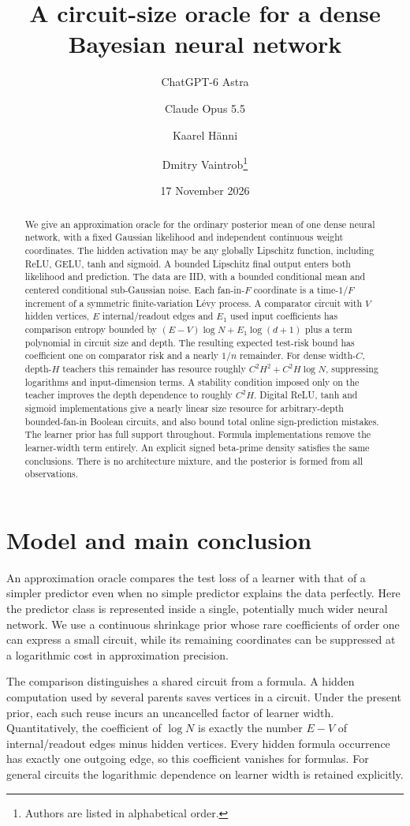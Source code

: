 \documentclass[11pt]{article}
\title{A circuit-size oracle for a dense\\Bayesian neural network}
\author{ChatGPT-6 Astra \and Claude Opus 5.5 \and Kaarel H\"anni \and Dmitry Vaintrob\thanks{Authors are listed in alphabetical order.}}
\date{17 November 2026}
\begin{document}
\maketitle
\begin{abstract}
We give an approximation oracle for the ordinary posterior mean of one dense neural network, with a fixed Gaussian likelihood and independent continuous weight coordinates. The hidden activation may be any globally Lipschitz function, including ReLU, GELU, tanh and sigmoid. A bounded Lipschitz final output enters both likelihood and prediction. The data are IID, with a bounded conditional mean and centered conditional sub-Gaussian noise. Each fan-in-$F$ coordinate is a time-$1/F$ increment of a symmetric finite-variation L\'evy process. A comparator circuit with $V$ hidden vertices, $E$ internal/readout edges and $E_1$ used input coefficients has comparison entropy bounded by $(E-V)\log N+E_1\log(d+1)$ plus a term polynomial in circuit size and depth. The resulting expected test-risk bound has coefficient one on comparator risk and a nearly $1/n$ remainder. For dense width-$C$, depth-$H$ teachers this remainder has resource roughly $C^2H^2+C^2H\log N$, suppressing logarithms and input-dimension terms. A stability condition imposed only on the teacher improves the depth dependence to roughly $C^2H$. Digital ReLU, tanh and sigmoid implementations give a nearly linear size resource for arbitrary-depth bounded-fan-in Boolean circuits, and also bound total online sign-prediction mistakes. The learner prior has full support throughout. Formula implementations remove the learner-width term entirely. An explicit signed beta-prime density satisfies the same conclusions. There is no architecture mixture, and the posterior is formed from all observations.
\end{abstract}

\section{Model and main conclusion}\label{sec:model}
An approximation oracle compares the test loss of a learner with that of a simpler predictor even when no simple predictor explains the data perfectly. Here the predictor class is represented inside a single, potentially much wider neural network. We use a continuous shrinkage prior whose rare coefficients of order one can express a small circuit, while its remaining coordinates can be suppressed at a logarithmic cost in approximation precision.

The comparison distinguishes a shared circuit from a formula. A hidden computation used by several parents saves vertices in a circuit. Under the present prior, each such reuse incurs an uncancelled factor of learner width. Quantitatively, the coefficient of $\log N$ is exactly the number $E-V$ of internal/readout edges minus hidden vertices. Every hidden formula occurrence has exactly one outgoing edge, so this coefficient vanishes for formulas. For general circuits the logarithmic dependence on learner width is retained explicitly.
\end{document}
